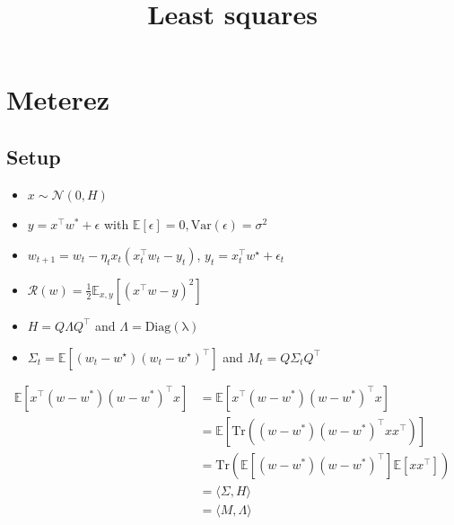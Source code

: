 \documentclass{article}
\title{Least squares}
\author{
}
\date{}
\newcommand{\var}{\mathrm{Var}}
\newcommand{\E}{\mathbb{E}}
\newcommand{\tr}{\mathrm{Tr}}
\begin{document}
\maketitle





\section{Meterez}



\subsection{Setup}


\begin{itemize}

\item[$-$] $x \sim \mathcal N(0,H)$

\item[$-$] $y=x^\top w^* + \epsilon$ \quad with $\E[\epsilon]=0, \var(\epsilon) = \sigma^2$

\item[$-$] $w_{t+1} = w_t - \eta_t x_t (x_t^\top w_t - y_t)$, \quad $y_t = x_t^\top w^\star +\epsilon_t$

\item[$-$] $\mathcal R(w) =  \frac{1}{2}\E_{x,y}[(x^\top w - y)^2]$


\item[$-$] $H = Q\Lambda Q^\top$ \quad and $\Lambda = \mathrm{Diag(\lambda)}$

\item[$-$] $\Sigma_t = \E[(w_t - w^\star)(w_t - w^\star)^\top]$ and $M_t = Q \Sigma_t Q^\top$

\end{itemize}

\begin{align*}
\E [x^\top (w - w^*) (w-w^*)^\top x]
&= \E [x^\top (w - w^*) (w-w^*)^\top x]\\
&= \E[\tr( (w - w^*) (w-w^*)^\top x x^\top)]\\
&= \tr\left(\E[(w - w^*) (w-w^*)^\top] \E[xx^\top]\right)\\
&=\langle \Sigma,H  \rangle\\
&= \langle M,\Lambda  \rangle 
\end{align*}
\end{document}

